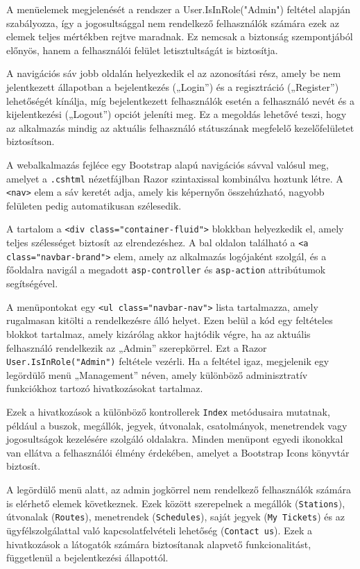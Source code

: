A menüelemek megjelenését a rendszer a User.IsInRole("Admin") feltétel alapján szabályozza, így a jogosultsággal nem rendelkező felhasználók számára ezek az elemek teljes mértékben rejtve maradnak. Ez nemcsak a biztonság szempontjából előnyös, hanem a felhasználói felület letisztultságát is biztosítja.

A navigációs sáv jobb oldalán helyezkedik el az azonosítási rész, amely be nem jelentkezett állapotban a bejelentkezés („Login”) és a regisztráció („Register”) lehetőségét kínálja, míg bejelentkezett felhasználók esetén a felhasználó nevét és a kijelentkezési („Logout”) opciót jeleníti meg. Ez a megoldás lehetővé teszi, hogy az alkalmazás mindig az aktuális felhasználó státuszának megfelelő kezelőfelületet biztosítson.

A webalkalmazás fejléce egy Bootstrap alapú navigációs sávval valósul meg, amelyet a \texttt{.cshtml} nézetfájlban Razor szintaxissal kombinálva hoztunk létre. A \texttt{<nav>} elem a sáv keretét adja, amely kis képernyőn összehúzható, nagyobb felületen pedig automatikusan szélesedik.

A tartalom a \texttt{<div class="container-fluid">} blokkban helyezkedik el, amely teljes szélességet biztosít az elrendezéshez. A bal oldalon található a \texttt{<a class="navbar-brand">} elem, amely az alkalmazás logójaként szolgál, és a főoldalra navigál a megadott \texttt{asp-controller} és \texttt{asp-action} attribútumok segítségével.

A menüpontokat egy \texttt{<ul class="navbar-nav">} lista tartalmazza, amely rugalmasan kitölti a rendelkezésre álló helyet. Ezen belül a kód egy feltételes blokkot tartalmaz, amely kizárólag akkor hajtódik végre, ha az aktuális felhasználó rendelkezik az „Admin” szerepkörrel. Ezt a Razor \texttt{User.IsInRole("Admin")} feltétele vezérli. Ha a feltétel igaz, megjelenik egy legördülő menü „Management” néven, amely különböző adminisztratív funkciókhoz tartozó hivatkozásokat tartalmaz.

Ezek a hivatkozások a különböző kontrollerek \texttt{Index} metódusaira mutatnak, például a buszok, megállók, jegyek, útvonalak, csatolmányok, menetrendek vagy jogosultságok kezelésére szolgáló oldalakra. Minden menüpont egyedi ikonokkal van ellátva a felhasználói élmény érdekében, amelyet a Bootstrap Icons könyvtár biztosít.

A legördülő menü alatt, az admin jogkörrel nem rendelkező felhasználók számára is elérhető elemek következnek. Ezek között szerepelnek a megállók (\texttt{Stations}), útvonalak (\texttt{Routes}), menetrendek (\texttt{Schedules}), saját jegyek (\texttt{My Tickets}) és az ügyfélszolgálattal való kapcsolatfelvételi lehetőség (\texttt{Contact us}). Ezek a hivatkozások a látogatók számára biztosítanak alapvető funkcionalitást, függetlenül a bejelentkezési állapottól.

